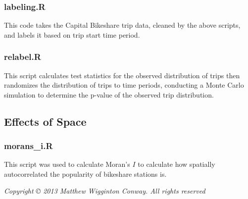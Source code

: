 \documentclass[letterpaper,11pt]{article}
\begin{document}


\subsubsection{labeling.R}
\label{labeling.R}

This code takes the Capital Bikeshare trip data, cleaned by the above
scripts, and labels it based on trip start time period.



\subsubsection{relabel.R}
\label{relabel.R}

This script calculates test statistics for the observed distribution
of trips then randomizes the distribution of trips to time periods,
conducting a Monte Carlo simulation to determine the p-value of the
observed trip distribution.



\subsection{Effects of Space}
\subsubsection{morans\_i.R}
\label{morans_i.R}

This script was used to calculate Moran's $I$ to calculate how
spatially autocorrelated the popularity of bikeshare stations is.



\emph{Copyright © 2013 Matthew Wigginton Conway. All rights reserved}
\end{document}
